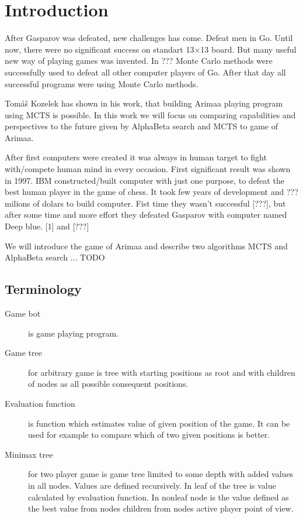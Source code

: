
\chapter{Introduction}
After Gasparov was defeated, new challenges has come. Defeat men in Go. Until
now, there were no significant success on standart 13$\times$13 board. But many
useful new way of playing games was invented. In ??? Monte Carlo methods were
successfully used to defeat all other computer players of Go. After that day
all successful programs were using Monte Carlo methods.

Tomáš Kozelek has shown in his work, that building Arimaa playing program using
MCTS is possible. In this work we will focus on comparing capabilities and
perspectives to the future given by AlphaBeta search and MCTS to game of
Arimaa.

After first computers were created it was always in human target to fight
with/compete human mind in every occasion. First significant result was shown
in 1997. IBM constructed/built computer with just one purpose, to defeat
the best human player in the game of chess. It took few years of development
and ??? milions of dolars to build computer. Fist time they wasn't successful
[???], but after some time and more effort they defeated Gasparov with computer
named Deep blue.
[1] and [???]

We will introduce the game of Arimaa and describe two algorithms \ac{MCTS} and AlphaBeta search ... TODO


\section{Terminology}
\begin{description}
\item[Game bot] is game playing program.
\item[Game tree] for arbitrary game is tree with starting positions as root and
   with children of nodes as all possible consequent positions.
\item[Evaluation function] is function which estimates value of given position of the game. It can be used for example to compare which of two given positions is better.
\item[Minimax tree] for two player game is game tree limited to some depth with
added values in all nodes. Values are defined recursively. In leaf of the tree
is value calculated by evaluation function. In nonleaf node is the value
defined as the best value from nodes children from nodes active player point
of view.
\end{description}


